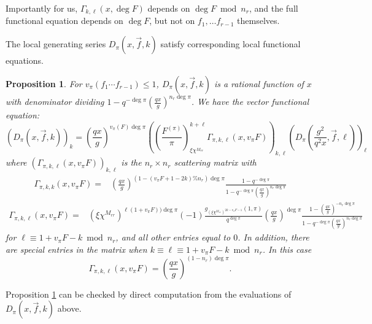 \documentclass[11pt,letterpaper]{article}
\newtheorem{prop}[theorem]{Proposition}
\theoremstyle{definition}
\theoremstyle{remark}
\numberwithin{equation}{section}
\theoremstyle{dotless}
\newcommand{\res}[2]{\left(\frac{#1}{#2}\right)}
\begin{document}
Importantly for us, $\Gamma_{k, \ell}(x, \deg F)$ depends on $\deg F \bmod n_r$, and the full functional equation depends on $\deg F$, but not on $f_1, \ldots f_{r-1}$ themselves. 

The local generating series $D_{\pi}(x, \vec{f}, k)$ satisfy corresponding local functional equations. 

\begin{prop}\label{PropLocalFE}
For $v_{\pi}(f_1\cdots f_{r-1}) \leq 1$, $D_{\pi}(x, \vec{f}, k)$ is a rational function of $x$ with denominator dividing $1-q^{-\deg \pi} \left( \frac{qx}{g}\right)^{n_r \deg \pi}$. We have the vector functional equation:
\begin{equation} \label{LocalFE}
\left( D_{\pi}(x, \vec{f}, k) \right)_k = \left(\frac{qx}{g} \right)^{v_{\pi}(F) \deg \pi} \left( \res{F^{(\pi)}}{\pi}_{\xi\chi^{M_{rr}}}^{k+\ell} \Gamma_{\pi, k, \ell}(x, v_{\pi} F) \right)_{k, \ell} \left( D_{\pi}\left(\frac{g^2}{q^2x}, \vec{f}, \ell \right) \right)_{\ell}
\end{equation}
where $\left( \Gamma_{\pi, k, \ell}(x, v_{\pi} F) \right)_{k, \ell}$ is the $n_r \times n_r$ scattering matrix with
\begin{equation*}
\begin{split}
\Gamma_{\pi, k,k}(x, v_{\pi} F) =& \left( \frac{qx}{g}\right)^{(1-(v_{\pi} F +1-2k)\% n_r)\deg \pi} \frac{1-q^{-\deg \pi}}{1-q^{-\deg \pi}\left( \frac{q x}{g}\right)^{n_r\deg \pi}}
\end{split}
\end{equation*}
\begin{equation*}
\begin{split}
\Gamma_{\pi, k,\ell}(x, v_{\pi} F) =&(\xi \chi^{M_{rr}})^{\ell(1+v_{\pi} F))\deg \pi}(-1)\frac{g_{(\xi \chi^{M_{rr}})^{2k-v_{\pi} F -1}}(1, \pi)}{q^{\deg \pi}}  \left( \frac{qx}{g}\right)^{\deg \pi} \frac{1-\left(\frac{q x}{g}\right)^{-n_r\deg \pi}}{1-q^{-\deg \pi}\left(\frac{q x}{g}\right)^{n_r\deg \pi}}
 \end{split}
\end{equation*}for $\ell \equiv 1+v_{\pi} F -k \bmod n_r$, and all other entries equal to $0$. In addition, there are special entries in the matrix when $k \equiv \ell \equiv 1+v_\pi F -k \bmod n_r$. In this case 
\begin{equation*}
\Gamma_{\pi, k,\ell}(x, v_{\pi} F)=\left(\frac{qx}{g}\right)^{(1-n_r)\deg \pi}.
\end{equation*}
\end{prop}

Proposition \ref{PropLocalFE} can be checked by direct computation from the evaluations of $D_{\pi}(x, \vec{f}, k)$ above. 
\end{document}
